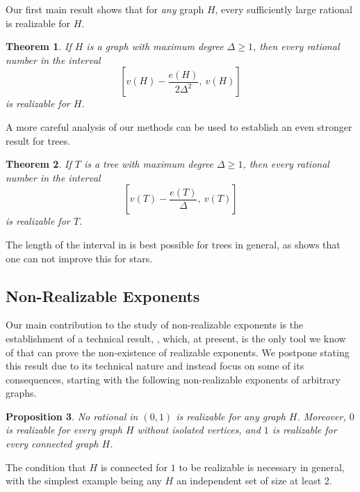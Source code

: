 \documentclass[12pt,letterpaper]{article}
\newtheorem{theorem}{Theorem}[section]
\newtheorem{proposition}[theorem]{Proposition}
\theoremstyle{definition}
\begin{document}
	Our first main result shows that for \textit{any} graph $H$, every sufficiently large rational is realizable for $H$.
	\begin{theorem}\label{theorem:maxDegreeGeneral}
		If $H$ is a graph with maximum degree $\Delta\ge 1$, then every rational number in the interval 
		\[\left[v(H)-\frac{e(H)}{2\Delta^2},\ v(H)\right]\]
		is realizable for $H$.
	\end{theorem}
	
	A more careful analysis of our methods can be used to establish an even stronger result for trees.
	\begin{theorem}\label{theorem:maxDegreeTrees}
		If $T$ is a tree with maximum degree $\Delta\ge 1$, then every rational number in the interval 
		\[\left[v(T)-\frac{e(T)}{\Delta},\ v(T)\right]\]
		is realizable for $T$.
	\end{theorem}
	The length of the interval in  is best possible for trees in general, as  shows that one can not improve this for stars.
	
	
	
	
	\subsection{Non-Realizable Exponents}  
	
	Our main contribution to the study of non-realizable exponents is the establishment of a technical result, , which, at present, is the only tool we know of that can prove the non-existence of realizable exponents.  We postpone stating this result due to its technical nature and instead focus on some of its consequences, starting with the following non-realizable exponents of arbitrary graphs.
	
	
	
	
	\begin{proposition}\label{proposition no 01 exponents}
		No rational in $(0,1)$ is realizable for any graph $H$.  Moreover, $0$ is realizable for every graph $H$ without isolated vertices, and $1$ is realizable for every connected graph $H$.
	\end{proposition}
	The condition that $H$ is connected for $1$ to be realizable is necessary in general, with the simplest example being any $H$ an independent set of size at least 2.
	
\end{document}
